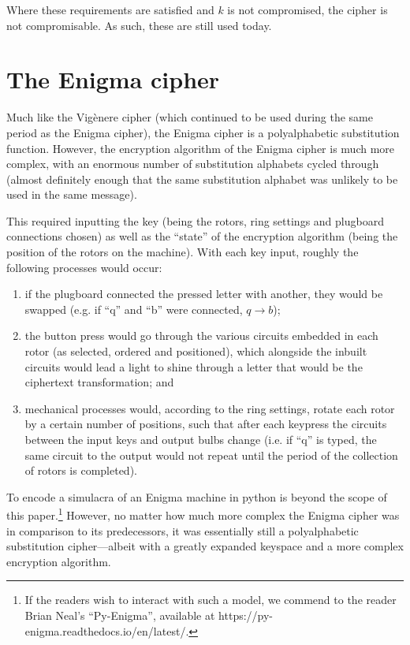 \documentclass{AIAA}
\begin{document}
Where these requirements are satisfied and $k$ is not compromised, the cipher is not compromisable. As such, these are still used today.

\section{The Enigma cipher}
Much like the Vig\`enere cipher (which continued to be used during the same period as the Enigma cipher), the Enigma cipher is a polyalphabetic substitution function. However, the encryption algorithm of the Enigma cipher is much more complex, with an enormous number of substitution alphabets cycled through (almost definitely enough that the same substitution alphabet was unlikely to be used in the same message). 

This required inputting the key (being the rotors, ring settings and plugboard connections chosen) as well as the ``state'' of the encryption algorithm (being the position of the rotors on the machine). With each key input, roughly the following processes would occur:

\begin{enumerate}
\item if the plugboard connected the pressed letter with another, they would be swapped (e.g. if ``q'' and ``b'' were connected, $q \longrightarrow b$);
\item the button press would go through the various circuits embedded in each rotor (as selected, ordered and positioned), which alongside the inbuilt circuits would lead a light to shine through a letter that would be the ciphertext transformation; and
\item mechanical processes would, according to the ring settings, rotate each rotor by a certain number of positions, such that after each keypress the circuits between the input keys and output bulbs change (i.e. if ``q'' is typed, the same circuit to the output would not repeat until the period of the collection of rotors is completed).
\end{enumerate}

To encode a simulacra of an Enigma machine in python is beyond the scope of this paper.\footnote[2]{If the readers wish to interact with such a model, we commend to the reader Brian Neal's ``Py-Enigma'', available at https://py-enigma.readthedocs.io/en/latest/.}  However, no matter how much more complex the Enigma cipher was in comparison to its predecessors, it was essentially still a polyalphabetic substitution cipher---albeit with a greatly expanded keyspace and a more complex encryption algorithm.
\end{document}

